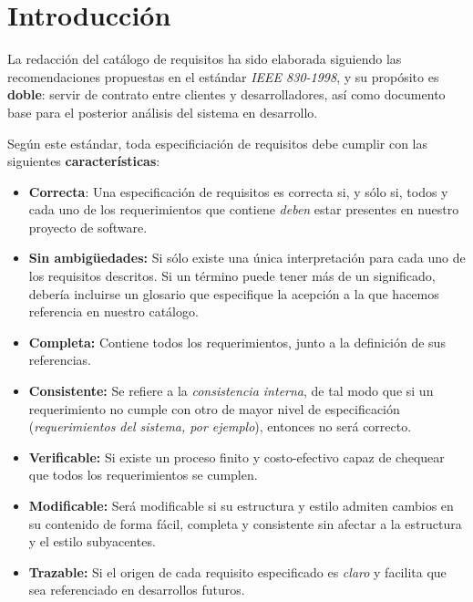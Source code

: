 
\section{Introducción}

La redacción del catálogo de requisitos ha sido elaborada siguiendo las recomendaciones propuestas en el estándar \textit{IEEE 830-1998}\cite{1998IEEESpecifications}, y su propósito es \textbf{doble}: servir de contrato entre clientes y desarrolladores, así como documento base para el posterior análisis del sistema en desarrollo.

Según este estándar, toda especificiación de requisitos debe cumplir con las siguientes \textbf{características}:

\begin{itemize}
    \item \textbf{Correcta}: Una especificación de requisitos es correcta si, y sólo si, todos y cada uno de los requerimientos que contiene \textit{deben} estar presentes en nuestro proyecto de software.
    \item \textbf{Sin ambigüedades:} Si sólo existe una única interpretación para cada uno de los requisitos descritos. Si un término puede tener más de un significado, debería incluirse un glosario que especifique la acepción a la que hacemos referencia en nuestro catálogo.
    \item \textbf{Completa:} Contiene todos los requerimientos, junto a la definición de sus referencias.
    \item \textbf{Consistente:} Se refiere a la \textit{consistencia interna}, de tal modo que si un requerimiento no cumple con otro de mayor nivel de especificación (\textit{requerimientos del sistema, por ejemplo}), entonces no será correcto.
    \item \textbf{Verificable:} Si existe un proceso finito y costo-efectivo capaz de chequear que todos los requerimientos se cumplen.
    \item \textbf{Modificable:} Será modificable si su estructura y estilo admiten cambios en su contenido de forma fácil, completa y consistente sin afectar a la estructura y el estilo subyacentes.
    \item \textbf{Trazable:} Si el origen de cada requisito especificado es \textit{claro} y facilita que sea referenciado en desarrollos futuros.

\end{itemize}



